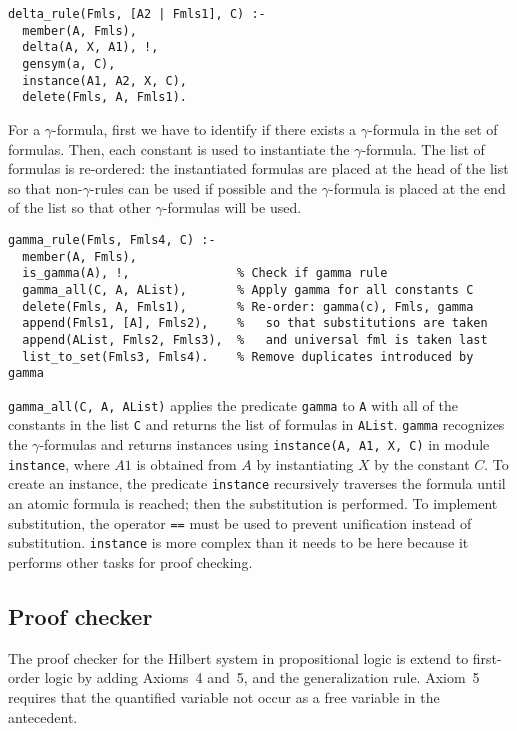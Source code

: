 \documentclass[11pt]{article}
\newcommand*{\p}[1]{\textup{\texttt{#1}}}
\begin{document}
\begin{verbatim}
delta_rule(Fmls, [A2 | Fmls1], C) :-
  member(A, Fmls),
  delta(A, X, A1), !,
  gensym(a, C),
  instance(A1, A2, X, C),
  delete(Fmls, A, Fmls1).
\end{verbatim}

For a $\gamma$-formula, first we have to identify if there exists a
$\gamma$-formula in the set of formulas. Then, each constant is used to
instantiate the $\gamma$-formula. The list of formulas is re-ordered:
the instantiated formulas are placed at the head of the list so that
non-$\gamma$-rules can be used if possible and the $\gamma$-formula is
placed at the end of the list so that other $\gamma$-formulas will be
used.

\begin{verbatim}
gamma_rule(Fmls, Fmls4, C) :-
  member(A, Fmls),
  is_gamma(A), !,               % Check if gamma rule
  gamma_all(C, A, AList),       % Apply gamma for all constants C
  delete(Fmls, A, Fmls1),       % Re-order: gamma(c), Fmls, gamma
  append(Fmls1, [A], Fmls2),    %   so that substitutions are taken
  append(AList, Fmls2, Fmls3),  %   and universal fml is taken last
  list_to_set(Fmls3, Fmls4).    % Remove duplicates introduced by gamma
\end{verbatim}

\p{gamma\_all(C, A, AList)} applies the predicate \p{gamma} to \p{A}
with all of the constants in the list \p{C} and returns the list of
formulas in \p{AList}. \p{gamma} recognizes the $\gamma$-formulas and
returns instances using \p{instance(A, A1, X, C)} in module
\p{instance}, where $A1$ is obtained from $A$ by instantiating $X$ by
the constant $C$. To create an instance, the predicate \p{instance}
recursively traverses the formula until an atomic formula is reached;
then the substitution is performed. To implement substitution, the
operator \p{==} must be used to prevent unification instead of
substitution. \p{instance} is more complex than it needs to be here
because it performs other tasks for proof checking.



\subsection{Proof checker}\label{s.checkfol}

The proof checker for the Hilbert system in propositional logic is
extend to first-order logic by adding Axioms~4 and~5, and the
generalization rule. Axiom~5 requires that the quantified variable not
occur as a free variable in the antecedent.
\end{document}
